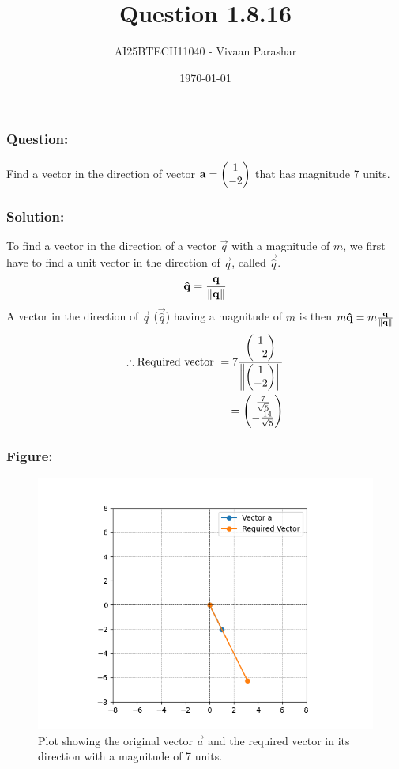 \documentclass{beamer}
\title{Question 1.8.16}
\author{AI25BTECH11040 - Vivaan Parashar}
\date{\today}
\begin{document}
\frame{\titlepage}

\begin{frame}
    \frametitle{Question: }
    Find a vector in the direction of vector $\mathbf{a} = \begin{pmatrix}1 \\ -2\end{pmatrix}$ that has magnitude 7 units.
\end{frame}

\begin{frame}
    \frametitle{Solution: }
    To find a vector in the direction of a vector $\vec{q}$ with a magnitude of $m$, we first have to find a unit vector in the direction of $\vec{q}$, called $\vec{\hat{q}}$.
    \begin{align}
        \mathbf{\hat{q}} = \frac{\mathbf{q}}{\left\lVert\mathbf{q}\right\rVert}
    \end{align}
    A vector in the direction of $\vec{q}$ ($\vec{\hat{q}}$) having a magnitude of $m$ is then $m \mathbf{\hat{q}} = m\frac{\mathbf{q}}{\left\lVert\mathbf{q}\right\rVert}$
    \begin{align}
        \therefore \text{Required vector } = 7\frac{\begin{pmatrix}1 \\ -2\end{pmatrix}}{\left\lVert\begin{pmatrix}1 \\ -2\end{pmatrix}\right\rVert}\\
        = \begin{pmatrix}\frac{7}{\sqrt{5}}                          \\ - \frac{14}{\sqrt{5}}\end{pmatrix}
    \end{align}
\end{frame}

\begin{frame}
    \frametitle{Figure:}
    \begin{figure}[h]
        \centering
        \includegraphics[width=0.8\columnwidth]{../figs/plot.png}
        \caption{Plot showing the original vector $\vec{a}$ and the required vector in its direction with a magnitude of 7 units.}
        \label{fig:plot}
    \end{figure}
\end{frame}
\end{document}
